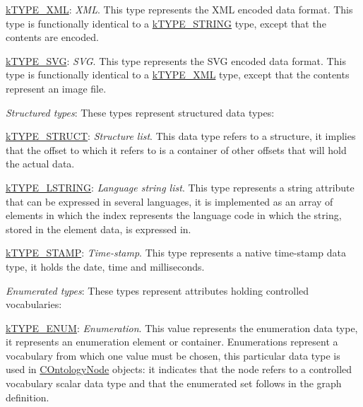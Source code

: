 \begin{DoxyItemize}
\begin{DoxyItemize}
\item {\ttfamily \hyperlink{}{k\-T\-Y\-P\-E\-\_\-\-X\-M\-L}}\-: {\itshape X\-M\-L}. This type represents the {\ttfamily X\-M\-L} encoded data format. This type is functionally identical to a \hyperlink{}{k\-T\-Y\-P\-E\-\_\-\-S\-T\-R\-I\-N\-G} type, except that the contents are encoded. 
\item {\ttfamily \hyperlink{}{k\-T\-Y\-P\-E\-\_\-\-S\-V\-G}}\-: {\itshape S\-V\-G}. This type represents the {\ttfamily S\-V\-G} encoded data format. This type is functionally identical to a \hyperlink{}{k\-T\-Y\-P\-E\-\_\-\-X\-M\-L} type, except that the contents represent an image file. 
\end{DoxyItemize}
\item {\itshape Structured types}\-: These types represent structured data types\-: 
\begin{DoxyItemize}
\item {\ttfamily \hyperlink{}{k\-T\-Y\-P\-E\-\_\-\-S\-T\-R\-U\-C\-T}}\-: {\itshape Structure list}. This data type refers to a structure, it implies that the offset to which it refers to is a container of other offsets that will hold the actual data. 
\item {\ttfamily \hyperlink{}{k\-T\-Y\-P\-E\-\_\-\-L\-S\-T\-R\-I\-N\-G}}\-: {\itshape Language string list}. This type represents a string attribute that can be expressed in several languages, it is implemented as an array of elements in which the index represents the language code in which the string, stored in the element data, is expressed in. 
\item {\ttfamily \hyperlink{}{k\-T\-Y\-P\-E\-\_\-\-S\-T\-A\-M\-P}}\-: {\itshape Time-\/stamp}. This type represents a native time-\/stamp data type, it holds the date, time and milliseconds. 
\end{DoxyItemize}
\item {\itshape Enumerated types}\-: These types represent attributes holding controlled vocabularies\-: 
\begin{DoxyItemize}
\item {\ttfamily \hyperlink{}{k\-T\-Y\-P\-E\-\_\-\-E\-N\-U\-M}}\-: {\itshape Enumeration}. This value represents the enumeration data type, it represents an enumeration element or container. Enumerations represent a vocabulary from which one value must be chosen, this particular data type is used in \hyperlink{class_c_ontology_node}{C\-Ontology\-Node} objects\-: it indicates that the node refers to a controlled vocabulary scalar data type and that the enumerated set follows in the graph definition. 

\end{DoxyItemize}
\end{DoxyItemize}
